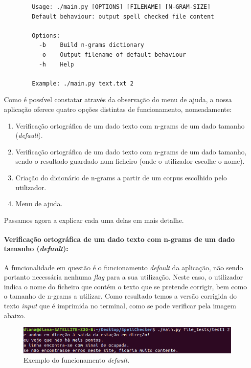 \documentclass{article}
\begin{document}
\begin{verbatim}
        Usage: ./main.py [OPTIONS] [FILENAME] [N-GRAM-SIZE]
        Default behaviour: output spell checked file content
        
        Options:
          -b	Build n-grams dictionary
          -o	Output filename of default behaviour
          -h	Help
        
        Example: ./main.py text.txt 2

\end{verbatim}

Como é possível constatar através da observação do menu de ajuda, a nossa aplicação oferece quatro opções distintas de funcionamento, nomeadamente:
\begin{enumerate}
    \item Verificação ortográfica de um dado texto com n-grams de um dado tamanho (\textit{default}).
    \item Verificação ortográfica de um dado texto com n-grams de um dado tamanho, sendo o resultado guardado num ficheiro (onde o utilizador escolhe o nome).
    \item Criação do dicionário de n-grams a partir de um corpus escolhido pelo utilizador.
    \item Menu de ajuda.
\end{enumerate}

Passamos agora a explicar cada uma delas em mais detalhe.

\paragraph{Verificação ortográfica de um dado texto com n-grams de um dado tamanho (\textit{default}):} 
A funcionalidade em questão é o funcionamento \textit{default} da aplicação, não sendo portanto necessária nenhuma \textit{flag} para a sua utilização. Neste caso, o utilizador indica o nome do ficheiro que contém o texto que se pretende corrigir, bem como o tamanho de n-grams a utilizar. Como resultado temos a versão corrigida do texto \textit{input} que é imprimida no terminal, como se pode verificar pela imagem abaixo.

\begin{figure}[H]
\begin{center}
    \includegraphics[width = 16cm, keepaspectratio]{Pictures/default.png}
    \caption{Exemplo do funcionamento \textit{default}. }
\end{center}
\end{figure}
\end{document}
